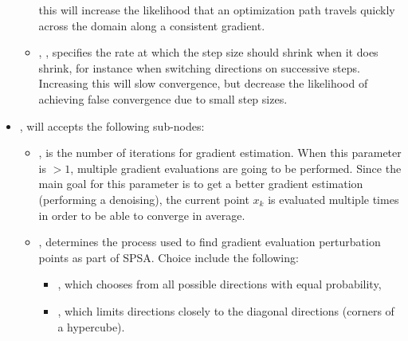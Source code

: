 \begin{itemize}
\begin{itemize}
    this will increase the likelihood that an optimization path travels quickly across the domain along a
    consistent gradient.
  \item {}, , specifies the rate at which the step size
    should shrink when it does shrink, for instance when switching directions on successive steps.  Increasing
    this will slow convergence, but decrease the likelihood of achieving false convergence due to small step
    sizes.
  \end{itemize}
\item {},  will accepts the following sub-nodes:
  \begin{itemize}
  \item {},  is the number of iterations for gradient estimation. When this
        parameter is $>1$, multiple gradient evaluations are going to be performed. Since the main goal for this parameter is to
        get a better gradient estimation (performing a denoising), the current point $x_k$ is evaluated multiple times in order to be able to
        converge in average.

  \item {},  determines the process used to find
        gradient evaluation perturbation points as part of SPSA. Choice include the following:
        \begin{itemize}
          \item {}, which chooses from all possible directions with equal probability,
          \item {}, which limits directions closely to the diagonal directions (corners of
                                       a hypercube).
        \end{itemize}


\end{itemize}
\end{itemize}
